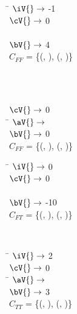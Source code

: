 \begin{subfigure}[t]{\textwidth}
  \begin{tabbing}
    \qquad \quad \= $\iV{} \rightarrow$ -1 \\
    \> $\cV{} \rightarrow$ 0 \\
    \\
    \> $\bV{} \rightarrow$ 4 \\
    \quad $C_{FF}$ = \{(\AV{}, \false{}), (\BV{}, \false{})\} \\
  \end{tabbing}
\end{subfigure}%
~
\begin{subfigure}[t]{\textwidth}
  \begin{tabbing}
    \qquad \quad \=  \\
    \> $\cV{} \rightarrow$ 0 \\
    \qquad \quad \= $\aV{} \rightarrow$ \fls{} \\
    \> $\bV{} \rightarrow$ 0 \\
    \quad $C_{FF}$ = \{(\AV{}, \false{}), (\BV{}, \true{})\} \\
  \end{tabbing}
\end{subfigure}%
\vfill
\begin{subfigure}[t]{\textwidth}
  \begin{tabbing}
    \qquad \quad \= $\iV{} \rightarrow$ 0 \\
    \> $\cV{} \rightarrow$ 0 \\
    \\
    \> $\bV{} \rightarrow$ -10 \\
    \quad $C_{FT}$ = \{(\AV{}, \true{}), (\BV{}, \false{})\} \\
  \end{tabbing}
\end{subfigure}%
~
\begin{subfigure}[t]{\textwidth}
  \begin{tabbing}
    \qquad \quad \= $\iV{} \rightarrow$ 2 \\
    \> $\cV{} \rightarrow$ 0 \\
    \qquad \quad \= $\aV{} \rightarrow$ \tru{} \\
    \> $\bV{} \rightarrow$ 3 \\
    \quad $C_{TT}$ = \{(\AV{}, \true{}), (\BV{}, \true{})\} \\
  \end{tabbing}
\end{subfigure}%